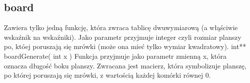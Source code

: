 \documentclass{article}
\begin{document}
\subsection{board}
Zawiera tylko jedną funkcję, która zwraca tablicę dwuwymiarową (a włąściwie wskaźnik na wskaźniki). Jako parametr przyjmuje integer czyli rozmiar planszy po, któej poruszają się mrówki (może ona mieć tylko wymiar kwadratowy). 
\newline int** boardGenerate( int x )
\newline Funkcja przyjmuje jako parametr zmienną x, która oznacza długość boku planszy.
\newline Zwracana jest macierz, która symbolizuje planszę, po której poruszają się mrówki, z wartością każdej komórki równej 0.
\newline
\end{document}

